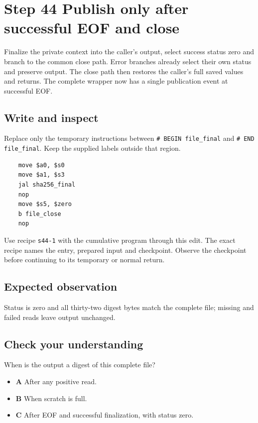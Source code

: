 \section{Step 44 Publish only after successful EOF and close}\label{sha-s44}

Finalize the private context into the caller's output, select success status zero and branch to the common close path. Error branches already select their own status and preserve output. The close path then restores the caller's full saved values and returns. The complete wrapper now has a single publication event at successful EOF.

\subsection{Write and inspect}
Replace only the temporary instructions between \texttt{\# BEGIN file\_final} and \texttt{\# END file\_final}. Keep the supplied labels outside that region.

\begin{verbatim}
    move $a0, $s0
    move $a1, $s3
    jal sha256_final
    nop
    move $s5, $zero
    b file_close
    nop
\end{verbatim}

Use recipe \texttt{s44-1} with the cumulative program through this edit. The exact recipe names the entry, prepared input and checkpoint. Observe the checkpoint before continuing to its temporary or normal return.

\subsection{Expected observation}
Status is zero and all thirty-two digest bytes match the complete file; missing and failed reads leave output unchanged.

\subsection{Check your understanding}
When is the output a digest of this complete file?

\begin{itemize}
\item \textbf{A} After any positive read.
\item \textbf{B} When scratch is full.
\item \textbf{C} After EOF and successful finalization, with status zero.
\end{itemize}
